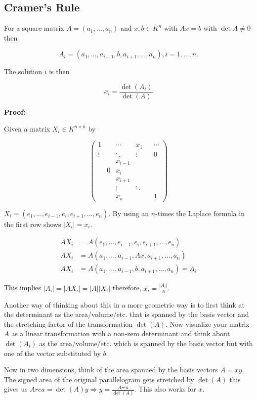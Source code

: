 \subsection{Cramer's Rule}

For a square matrix \(A = (a_1, \dots, a_n)\) and \(x,b \in K^{n}\) with \(Ax = b\) with \(\det A \ne 0\) 
then

\[
	A_i = (a_1, \dots, a_{i - 1}, b, a_{i + 1}, \dots, a_n), i = 1,\dots,n.
\]

The solution \(i\) is then

\[
	x_i = \frac{\det(A_i)}{\det(A)}
\]

\textbf{Proof:}

Given a matrix \(X_i \in K^{n \times n}\) by

\[
	\begin{pmatrix}
		1  &  &\cdots     & x_1    & &\cdots \\
	\vdots &  &\ddots     & \vdots & & 0     \\
		&  &x_{i - 1}  &        & &       \\
		&0 & x_i 	  &		   & &       \\
		&  & x_{i + 1} &        & &       \\
		&  & \vdots    & \ddots & &       \\
		&  & x_n       &        & &    1   
	\end{pmatrix}
\]

\(X_i = (e_1, \dots, e_{i - 1}, e_i, e_{i + 1}, \dots, e_n)\). By using an \(n\)-times the 
Laplace formula in the first row shows \(|X_i| = x_i\).

\begin{align*}
	A X_i &= A (e_1, \dots, e_{i - 1}, e_i, e_{i + 1}, \dots, e_n)\\
	A X_i &= A (a_1, \dots, a_{i - 1}, Ax, a_{i + 1}, \dots, a_n)\\
	A X_i &= A (a_1, \dots, a_{i - 1}, b, a_{i + 1}, \dots, a_n) = A_i
\end{align*}

This implies \(|A_i| = |AX_i| = |A||X_i|\) therefore, \(x_i = \frac{|A_i|}{A}\).

\QED

Another way of thinking about this in a more geometric way is to first think at the determinant as 
the area/volume/etc. that is spanned by the basis vector and the stretching factor of the transformation 
\(\det(A)\). Now visualize your matrix \(A\) as a linear transformation with 
a non-zero determinant and think about \(\det(A_i)\) as the area/volume/etc. which is spanned by the 
basis vector but with one of the vector substituted by \(b\).
\vspace{\baselineskip}

Now in two dimensions, think of the area spanned by the basis vectors \(A = xy\). 
The signed area of the original parallelogram gets 
stretched by \(\det(A)\) this gives us \(Area = \det(A)y \Rightarrow y = \frac{Area}{\det(A)}\). This 
also works for \(x\).
